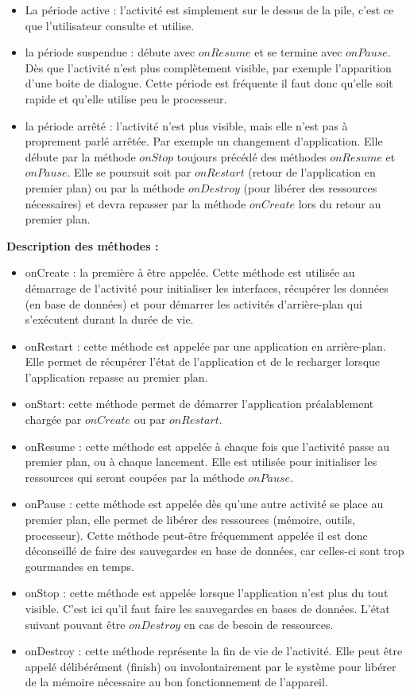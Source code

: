 \documentclass[francais,12pt]{article}
\begin{document}
		\begin{itemize}
			\item La période active : l'activité est simplement sur le dessus de la pile, c'est ce que l'utilisateur consulte et utilise. 
			\item la période suspendue : débute avec $onResume$ et se termine avec $onPause$. Dès que l'activité n'est plus complètement visible, par exemple l'apparition d'une boite de dialogue. Cette période est fréquente il faut donc qu'elle soit rapide et qu'elle utilise peu le processeur.
			\item la période arrêté : l'activité n'est plus visible, mais elle n'est pas à proprement parlé arrêtée. Par exemple un changement d'application. Elle débute par la méthode $onStop$ toujours précédé des méthodes $onResume$ et $onPause$. Elle se poursuit soit par $onRestart$ (retour de l'application en premier plan) ou par la méthode $onDestroy$ (pour libérer des ressources nécessaires) et devra repasser par la méthode $onCreate$ lors du retour au premier plan.
		\end{itemize}
		
			\textbf{Description des méthodes :}
		\begin{itemize}
			\item onCreate : la première à être appelée. Cette méthode est utilisée au démarrage de l'activité pour initialiser les interfaces, récupérer les données (en base de données) et pour démarrer les activités d'arrière-plan qui s'exécutent durant la durée de vie.
			\item onRestart : cette méthode est appelée par une application en arrière-plan. Elle permet de récupérer l'état de l'application et de le recharger lorsque l'application repasse au premier plan.
			\item onStart: cette méthode permet de démarrer l'application préalablement chargée par $onCreate$ ou par $onRestart$.
			\item onResume : cette méthode est appelée à chaque fois que l'activité passe au premier plan, ou à chaque lancement. Elle est utilisée pour initialiser les ressources qui seront coupées par la méthode $onPause$. 
			\item onPause : cette méthode est appelée dès qu'une autre activité se place au premier plan, elle permet de libérer des ressources (mémoire, outils, processeur). Cette méthode peut-être fréquemment appelée il est donc déconseillé de faire des sauvegardes en base de données, car celles-ci sont trop gourmandes en temps.
			\item onStop : cette méthode est appelée lorsque l'application n'est plus du tout visible. C'est ici qu'il faut faire les sauvegardes en bases de données. L'état suivant pouvant être $onDestroy$ en cas de besoin de ressources. 
			\item onDestroy : cette méthode représente la fin de vie de l'activité. Elle peut être appelé délibérément (finish) ou involontairement par le système pour libérer de la mémoire nécessaire au bon fonctionnement de l'appareil.\newline
		\end{itemize}
	
\end{document}
